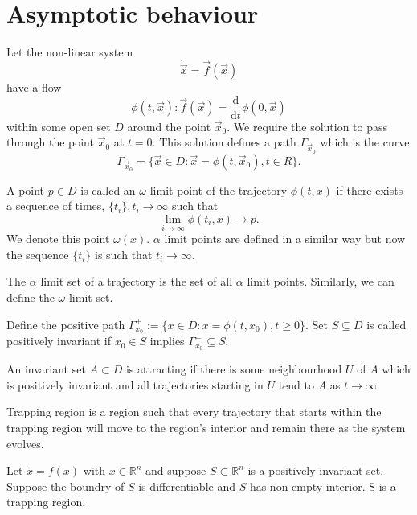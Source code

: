 \section{Asymptotic behaviour}
Let the non-linear system
\begin{equation}
    \label{eqn:system}
    \dot{\vec x} = \vec f(\vec x) 
\end{equation}
have a flow
\begin{equation*}
    \phi(t, \vec x): \vec f(\vec x) = \frac{\mathrm d}{\mathrm dt} \phi(0, \vec x)
\end{equation*}
within some open set $D$ around the point $\vec x_0$. We require the solution to pass through the point $\vec x_0$ at $t = 0$. This solution defines a path $\Gamma_{\vec x_0}$ which is the curve
\begin{equation*}
    \Gamma_{\vec x_0} = \{\vec x \in D: \vec x = \phi(t, \vec x_0), t \in R\}.
\end{equation*}

\begin{definition}
    A point $p \in D$ is called an $\omega$ limit point of the trajectory $\phi(t, x)$ if there exists a sequence of times, $\{t_i\}, t_i \to \infty$ such that
    \begin{equation}
        \lim_{i \to \infty} \phi(t_i, x) \to p.
    \end{equation}
    We denote this point $\omega(x)$. $\alpha$ limit points are defined in a similar way but now the sequence $\{t_i\}$ is such that $t_i \to \infty$.

    The $\alpha$ limit set of a trajectory is the set of all $\alpha$ limit points. Similarly, we can define the $\omega$ limit set.
\end{definition}

\begin{definition}
    Define the positive path $\Gamma_{x_0}^+ := \{x \in D: x = \phi(t, x_0), t \geq 0\}$. Set $S \subseteq D$ is called positively invariant if $x_0 \in S$ implies $\Gamma_{x_0}^+ \subseteq S$.
\end{definition}

\begin{definition}
    An invariant set $A \subset D$ is attracting if there is some neighbourhood $U$ of $A$ which is positively invariant and all trajectories starting in $U$ tend to $A$ as $t \to \infty$.
\end{definition}

\begin{definition}
    Trapping region is a region such that every trajectory that starts within the trapping region will move to the region's interior and remain there as the system evolves.

    Let $\dot x = f(x)$ with $x \in \mathbb R^n$ and suppose $S \subset \mathbb R^n$ is a positively invariant set. Suppose the boundry of $S$ is differentiable and $S$ has non-empty interior. S is a trapping region.
\end{definition}

